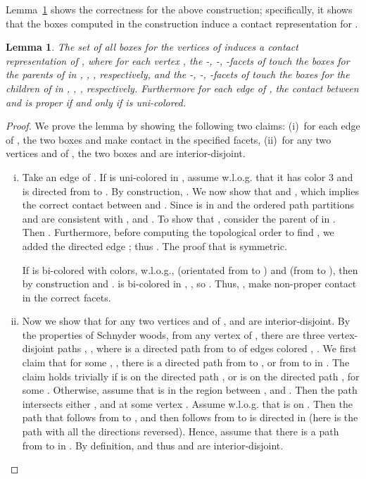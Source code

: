 \documentclass{article}
\newtheorem{lemma}[theorem]{Lemma}
\newcommand{\WLOG}{w.l.o.g.\xspace}
\begin{document}
Lemma~\ref{lem:box-schny} shows the correctness
for the above construction; specifically,
 it shows that the boxes computed in the construction induce a contact representation for .

\begin{lemma}
\label{lem:box-schny}
The set of all boxes  for the vertices  of  induces a contact representation of , where
 for each vertex , the -, -, -facets of  touch the boxes for the parents of
  in , , , respectively, and the -, -, -facets of  touch
 the boxes for the children of  in , , , respectively. Furthermore for each
 edge  of , the contact between  and  is proper if and only if  is uni-colored.
\end{lemma}
\begin{proof} We prove the lemma by showing the following two claims:
 (i)~for each edge  of , the two boxes  and  make contact in the specified facets,
 (ii)~for any two vertices  and  of , the two boxes  and  are interior-disjoint.

\begin{enumerate}[(i)]
\item Take an edge  of . If  is uni-colored in , assume \WLOG that it has color 3 and is directed from  to .
 By construction, . We now show that  and
 , which implies the correct contact between  and .
 Since  is in  and the ordered path partitions  and  are consistent
 with ,  and .
 To show that , consider the parent  of  in .
 Then . Furthermore, before computing the topological order to find , we added
 the directed edge ; thus . The proof that  is symmetric.

 If  is bi-colored with colors, \WLOG,  (orientated from  to ) and  (from  to ),
 then by construction  and . 
  is bi-colored in , , so . Thus, ,  make
 non-proper contact in the correct facets.

\item Now we show that for any two vertices  and  of ,  and  are
 interior-disjoint. By the properties of Schnyder woods, from any vertex  of ,
 there are three vertex-disjoint paths , ,  where  is 
 a directed path from  to  of edges colored , .
We first claim that for some , , there is a directed path from  to ,
 or from  to  in . The claim holds trivially if 
 is on the directed path , or  is on the directed path , for some .
 Otherwise, assume that  is in the region between , and . Then the path 
 intersects either , and  at some vertex . Assume \WLOG that
  is on . Then the path  that follows  from  to , and then follows
  from  to  is directed in  (here  is the path
  with all the directions reversed). Hence, assume that there is a path from  to  in
 . By definition,  and thus  and  are
 interior-disjoint.
\end{enumerate}\vspace{-0.7cm}
\end{proof}
\end{document}
